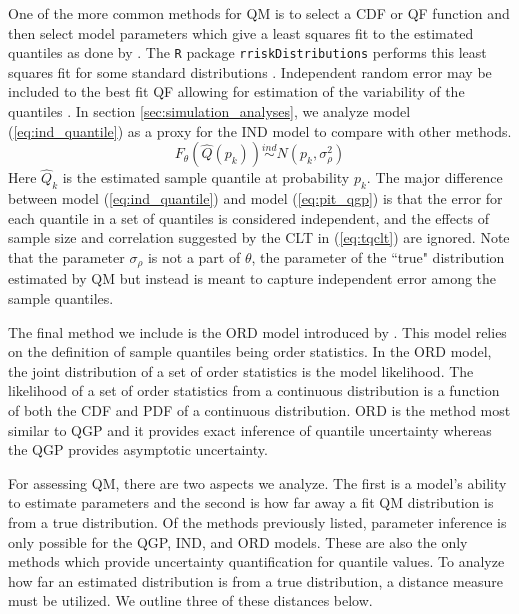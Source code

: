 \documentclass[preprint,12pt,authoryear]{elsarticle}
\begin{document}
One of the more common methods for QM is to select a CDF or QF function and then select model parameters which give a least squares fit to the estimated quantiles as done by \cite{li2019combining}. 
The \texttt{R} package \texttt{rriskDistributions} performs this least squares fit for some standard distributions \cite[]{belgorodski2017quantilemse}. Independent random error may be included to the best fit QF allowing for estimation of the variability of the quantiles \cite[]{nirwan2020bayesian}. In section \ref{sec:simulation_analyses}, we analyze model (\ref{eq:ind_quantile}) as a proxy for the IND model to compare with other methods. 
\begin{equation}
    \label{eq:ind_quantile}
    F_{\theta}(\hat{Q}(p_k)) \overset{ind}{\sim} N(p_k, \sigma_{\rho}^2)
\end{equation}
Here $\hat{Q}_k$ is the estimated sample quantile at probability $p_k$. The major difference between model (\ref{eq:ind_quantile}) and model (\ref{eq:pit_qgp}) is that the error for each quantile in a set of quantiles is considered independent, and the effects of sample size and correlation suggested by the CLT in (\ref{eq:tqclt}) are ignored. Note that the parameter $\sigma_{\rho}$ is not a part of $\theta$, the parameter of the ``true" distribution estimated by QM but instead is meant to capture independent error among the sample quantiles.





The final method we include is the ORD model introduced by \cite{nirwan2020bayesian}. This model relies on the definition of sample quantiles being order statistics. In the ORD model, the joint distribution of a set of order statistics is the model likelihood. The likelihood of a set of order statistics from a continuous distribution is a function of both the CDF and PDF of a continuous distribution. ORD is the method most similar to QGP and it provides exact inference of quantile uncertainty whereas the QGP provides asymptotic uncertainty. 

For assessing QM, there are two aspects we analyze. The first is a model's ability to estimate parameters and the second is how far away a fit QM distribution is from a true distribution. Of the methods previously listed, parameter inference is only possible for the QGP, IND, and ORD models. These are also the only methods which provide uncertainty quantification for quantile values. To analyze how far an estimated distribution is from a true distribution, a distance measure must be utilized. We outline three of these distances below.
\end{document}
